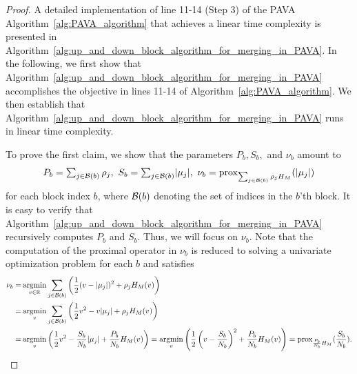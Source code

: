 \begin{proof}
A detailed implementation of line 11-14 (Step 3) of the PAVA Algorithm~\ref{alg:PAVA_algorithm} that achieves a linear time complexity is presented in Algorithm~\ref{alg:up_and_down_block_algorithm_for_merging_in_PAVA}. In the following, we first show that Algorithm~\ref{alg:up_and_down_block_algorithm_for_merging_in_PAVA} accomplishes the objective in lines 11-14 of Algorithm~\ref{alg:PAVA_algorithm}. We then establish that Algorithm~\ref{alg:up_and_down_block_algorithm_for_merging_in_PAVA} runs in linear time complexity.



To prove the first claim, we show that the parameters $P_b, S_b,$ and $\nu_b$ amount to
\begin{align*}
    \textstyle
    P_b = \sum_{j \in \mathcal{B}(b)} \rho_j, ~ 
    S_b = \sum_{j \in \mathcal{B}(b)} \lvert \mu_j \rvert, ~ 
    \nu_b = \operatorname{prox}_{\sum_{j \in \mathcal{B}(b)} \rho_j H_M}(|\mu_j|)
\end{align*}
for each block index $b$, where $\mathcal{B}(b)$ denoting the set of indices in the $b$'th block. It is easy to verify that Algorithm~\ref{alg:up_and_down_block_algorithm_for_merging_in_PAVA} recursively computes $P_b$ and $S_b$. Thus, we will focus on $\nu_b$.
Note that the computation of the proximal operator in $\nu_b$ is reduced to solving a univariate optimization problem for each $b$ and satisfies
\begin{align*}
    \nu_b =& \operatorname*{\arg\!\min}_{v \in \mathbb{R}} \sum_{j \in \mathcal{B}(b)} \left( \frac{1}{2} (v - \lvert \mu_j \rvert)^2 + \rho_j H_M(v) \right) \\
    = & \operatorname*{\arg\!\min}_{v} \sum_{j \in \mathcal{B}(b)} \left( \frac{1}{2} v^2 - v\lvert \mu_j \rvert + \rho_j H_M(v) \right) \\
    = & \operatorname*{\arg\!\min}_{v} \left( \frac{1}{2} v^2 - \frac{S_b}{N_b} \lvert \mu_j \rvert + \frac{P_b}{N_b} H_M(v) \right) 
    = \operatorname*{\arg\!\min}_{v} \left( \frac{1}{2} \left( v - \frac{S_b}{N_b} \right)^2 + \frac{P_b}{N_b} H_M(v) \right) 
    = \operatorname{prox}_{\frac{P_b}{N_b} H_{M}}(\frac{S_b}{N_b}).
\end{align*}


\end{proof}
